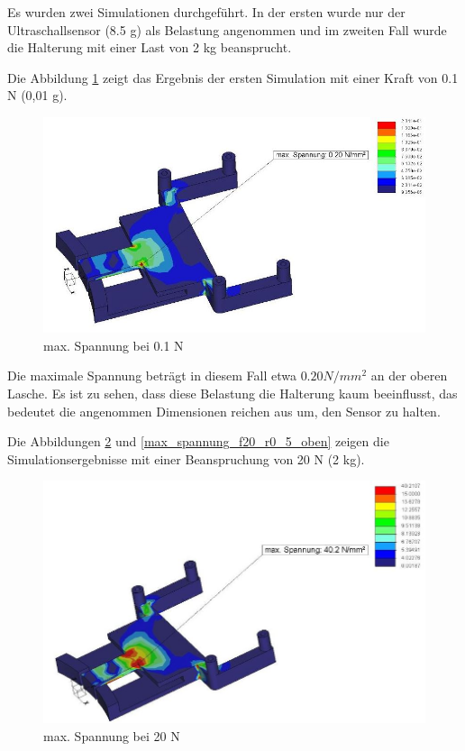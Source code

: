 	Es wurden zwei Simulationen durchgeführt. In der ersten wurde nur der Ultraschallsensor (8.5 g) als Belastung angenommen und im zweiten Fall  wurde die Halterung mit einer Last von 2 kg beansprucht.

	Die Abbildung \ref{max_spannung_f0_1_r0_5} zeigt das Ergebnis der ersten Simulation mit einer Kraft von 0.1 N (0,01 g).

			\begin{figure}[H]
			\begin{centering}
			\includegraphics[width = 1.1\textwidth]{Bilder/max_spannung_f0_1_r0_5}
			\par\end{centering}
			\caption{max. Spannung bei 0.1 N}
			\label{max_spannung_f0_1_r0_5}
			\end{figure}

	Die maximale Spannung beträgt in diesem Fall etwa $0.20 N/mm^{2}$ an der oberen Lasche.
	Es ist zu sehen, dass diese Belastung die Halterung kaum beeinflusst, das bedeutet die angenommen Dimensionen reichen aus um, den Sensor zu halten.

	Die Abbildungen \ref{max_spannung_f20_r0_5} und \ref{max_spannung_f20_r0_5_oben}  zeigen die Simulationsergebnisse mit einer Beanspruchung von 20 N (2 kg).

			\begin{figure}[H]
			\begin{centering}
			\includegraphics[width = 1.1\textwidth]{Bilder/max_spannung_f20_r0_5}
			\par\end{centering}
			\caption{max. Spannung bei 20 N}
			\label{max_spannung_f20_r0_5}
			\end{figure}

